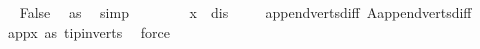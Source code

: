 \begin{isabellebody}
\ \isamarkupfalse%
\ False\ \isamarkupfalse%
\ as{}\ \isamarkupfalse%
\ simp\isanewline
\ \ \isamarkupfalse%
\isanewline
\ \ \isamarkupfalse%
\ \isamarkupfalse%
\ {\isachardoublequoteopen}x\ {\isacharequal}{\kern0pt}\ dis{\isachardoublequoteclose}\ \isamarkupfalse%
\ \isanewline
\ \ append{\isacharunderscore}{\kern0pt}verts{\isacharunderscore}{\kern0pt}diff\ A{}{\isachardot}{\kern0pt}append{\isacharunderscore}{\kern0pt}verts{\isacharunderscore}{\kern0pt}diff\ \isamarkupfalse%
\ app{\isacharunderscore}{\kern0pt}x\ as{}\ tip{\isacharunderscore}{\kern0pt}in{\isacharunderscore}{\kern0pt}verts\ \isamarkupfalse%
\ force\isanewline
{}\isamarkupfalse%
%
\endisatagproof
{\isafoldproof}%
%
\isadelimproof
\isanewline
%
\endisadelimproof
\isanewline
\isanewline
%
\isadelimtheory
\isanewline
%
\endisadelimtheory
%
\isatagtheory
{}\isamarkupfalse%
%
\endisatagtheory
{\isafoldtheory}%
%
\isadelimtheory
%
\endisadelimtheory
%
\end{isabellebody}%
\endinput
